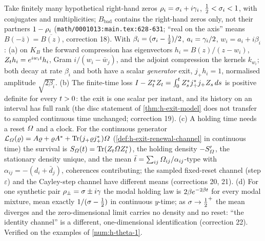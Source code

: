 \begin{theorem}
\label{thm:gl1-bad-zero-renewal}
Take finitely many hypothetical right-hand zeros $\rho_i = \sigma_i+i\gamma_{i}$, $\tfrac12<\sigma_i<1$, with conjugates and
multiplicities; $B_{\mathrm{bad}}$ contains the right-hand zeros only, not their partners $1-\rho_i$
(\texttt{math/0001013:main.tex:628-631}; ``real on the axis'' means $B(-\bar z) = \overline{B(z)}$, correction 18). With
$\beta_i = (\sigma_i-\tfrac12)/2$, $a_i = \gamma_{i}/2$, $w_i = a_i+i\beta_i$: (a) on $K_B$ the forward compression has
eigenvectors $h_i = B(z)/(z-w_i)$, $Z_t h_i = e^{iw_it}h_i$, Gram $i/(w_i-\bar w_j)$, and the adjoint compression the
kernels $k_{w_i}$; both decay at rate $\beta_i$ and both have a scalar \emph{generator} exit, $j_+h_i = 1$, normalised
amplitude $\sqrt{2\beta_i}$. (b) The finite-time loss $I-Z_t^{*}Z_t = \int_0^t Z_s^{*}j_+^{*}j_+Z_s\,ds$ is positive
definite for every $t>0$: the exit is one scalar per instant, and its history on an interval has full rank (the disc
statement of \cref{thm:h-exit-model} does not transfer to sampled continuous time unchanged; correction 19). (c) A
holding time needs a reset $\varOmega$ and a clock. For the continuous generator $\mathcal L_{\varOmega}(\varrho) = A\varrho+\varrho A^{*}
+\operatorname{Tr}(j_+\varrho j_+^{*})\varOmega$ (\cref{def:h-exit-renewal-channel} in continuous time) the survival is $S_{\varOmega}(t) =
\operatorname{Tr}(Z_t\varOmega Z_t^{*})$, the holding density $-S_{\varOmega}'$, the stationary density unique, and the mean
$\bar{t} = \sum_{ij}\varOmega_{ij}/\alpha_{ij}$-type with $\alpha_{ij} = -(d_i+\bar d_j)$, coherences contributing; the sampled
fixed-reset channel (step $\varepsilon$) and the Cayley-step channel have different means (corrections 20, 21). (d) For one
synthetic pair $\rho_\pm = \sigma\pm i\gamma$ the modal holding law is $2\beta e^{-2\beta t}$ for every modal mixture, mean
exactly $1/(\sigma-\tfrac12)$ in continuous $y$-time; as $\sigma\to\tfrac12^{+}$ the mean diverges and the zero-dimensional
limit carries no density and no reset: ``the identity channel'' is a different, one-dimensional identification
(correction 22). Verified on the examples of \cref{num:h-theta-1}.
\end{theorem}

